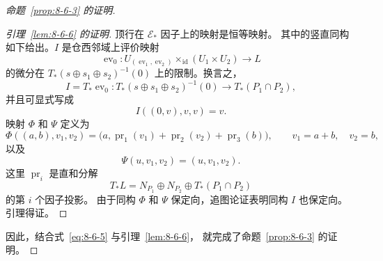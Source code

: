 \begin{proof}[命题~\ref{prop:8-6-3} 的证明]
\begin{proof}[引理~\ref{lem:8-6-6} 的证明]
顶行在 $\mathcal E_*$ 因子上的映射是恒等映射。
其中的竖直同构如下给出。$I$ 是仓西邻域上评价映射
\[
 \operatorname{ev}_0\colon
 U_{(\operatorname{ev}_1,\operatorname{ev}_2)}
 \mathop{\times}_{\mathrm{id}}(U_1\times U_2)\longrightarrow L
\]
的微分在 $T_*(s\oplus s_1\oplus s_2)^{-1}(0)$ 上的限制。换言之，
\[
 I=T_*\operatorname{ev}_0\colon
 T_*(s\oplus s_1\oplus s_2)^{-1}(0)
 \longrightarrow T_*(P_1\cap P_2),
\]
并且可显式写成
\[
 I((0,v),v,v)=v.
\]
映射 $\Phi$ 和 $\Psi$ 定义为
\[
 \Phi((a,b),v_1,v_2)
 =\bigl(a,\operatorname{pr}_1(v_1)+\operatorname{pr}_2(v_2)
 +\operatorname{pr}_3(b)\bigr),
 \qquad v_1=a+b,\quad v_2=b,
\]
以及
\[
 \Psi(u,v_1,v_2)=(u,v_1,v_2).
\]
这里 $\operatorname{pr}_i$ 是直和分解
\[
 T_*L=N_{P_1}\oplus N_{P_2}\oplus T_*(P_1\cap P_2)
\]
的第 $i$ 个因子投影。%
由于同构 $\Phi$ 和 $\Psi$ 保定向，追图论证表明同构 $I$
也保定向。引理得证。
\end{proof}

因此，结合式~\eqref{eq:8-6-5} 与引理~\ref{lem:8-6-6}，
就完成了命题~\ref{prop:8-6-3} 的证明。
\end{proof}
